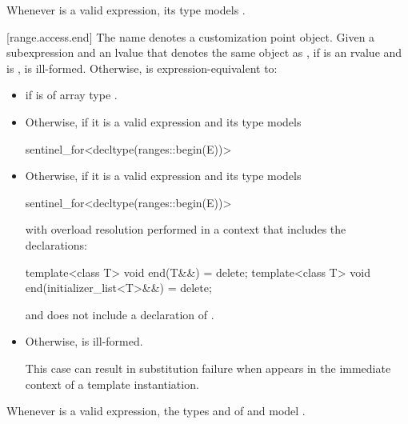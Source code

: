 \pnum
\begin{note}
Whenever  is a valid expression, its type models
.
\end{note}

[range.access.end]{}
\pnum
The name  denotes a customization point
object.
Given a subexpression  and
an lvalue  that denotes the same object as ,
if  is an rvalue and
 is ,
 is ill-formed.
Otherwise,
 is
expression-equivalent to:
\begin{itemize}
\item
   if  is of array
  type .

\item
  Otherwise,
  if it is a valid expression and its type  models
\begin{codeblock}
sentinel_for<decltype(ranges::begin(E))>
\end{codeblock}

\item
  Otherwise,  if it is a valid
  expression and its type  models
\begin{codeblock}
sentinel_for<decltype(ranges::begin(E))>
\end{codeblock}
  with overload
  resolution performed in a context that includes the declarations:
\begin{codeblock}
template<class T> void end(T&&) = delete;
template<class T> void end(initializer_list<T>&&) = delete;
\end{codeblock}
  and does not include a declaration of .

\item
  Otherwise,  is ill-formed.
  \begin{note}
  This case can result in substitution failure when 
  appears in the immediate context of a template instantiation.
  \end{note}
\end{itemize}

\pnum
\begin{note}
Whenever  is a valid expression,
the types  and  of
 and 
model .
\end{note}


